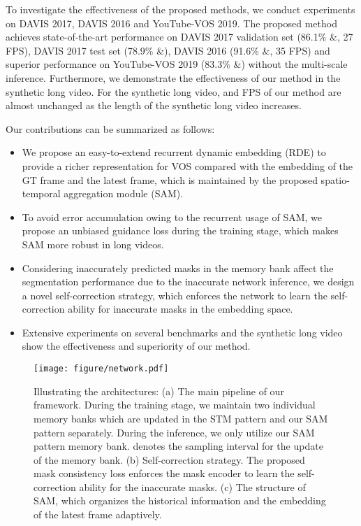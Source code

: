 \documentclass[10pt,twocolumn,letterpaper]{article}
\begin{document}
To investigate the effectiveness of the proposed methods, we conduct experiments on DAVIS 2017, DAVIS 2016 and YouTube-VOS 2019. The proposed method achieves state-of-the-art performance on DAVIS 2017 validation set (86.1\%  \&, 27 FPS), DAVIS 2017 test set (78.9\%  \&), DAVIS 2016  (91.6\% \&, 35 FPS) and superior performance on YouTube-VOS 2019 (83.3\% \&) without the multi-scale inference. Furthermore, we  demonstrate the effectiveness of our method in the synthetic long video. For the synthetic long video,  and FPS of our method are almost unchanged as the length of the synthetic long video increases.

Our contributions can be summarized as follows:
\vspace{-0.7em}
\begin{itemize}
    \item We propose an easy-to-extend recurrent dynamic embedding (RDE) to provide a richer representation for VOS compared with the embedding of the GT frame and the latest frame, which is maintained by the proposed spatio-temporal aggregation module (SAM).
    \vspace{-.5em}
    \item To avoid error accumulation owing to the recurrent usage of SAM, we propose an unbiased guidance loss during the training stage, which makes SAM  more robust in long videos. 
    \vspace{-.5em}
    \item Considering inaccurately predicted masks in the memory bank affect the segmentation performance due to the inaccurate network inference, we design a novel self-correction strategy, which enforces the network to learn the self-correction ability for inaccurate masks in the embedding space.
    \vspace{-.5em}
    \item Extensive experiments on several benchmarks and  the synthetic long video show the effectiveness and superiority of our method.
\end{itemize}
\vspace{-.5em}



\begin{figure*}[!t]
\centering \texttt{[image: figure/network.pdf]}
\vspace{-1.2em}
\caption{
Illustrating the architectures: (a) The main pipeline of our framework. During the training stage, we maintain two individual memory banks which are updated in the STM pattern and our SAM pattern separately. During the inference, we only utilize our SAM pattern memory bank.  denotes the sampling interval for the update of the memory bank. (b) Self-correction strategy. The proposed mask consistency loss  enforces the mask encoder to learn the self-correction ability for the inaccurate masks. (c) The structure of SAM, which organizes the historical information and the embedding of the latest frame adaptively. }
\vspace{-1em}
\label{fig:network}
\end{figure*}
\end{document}
